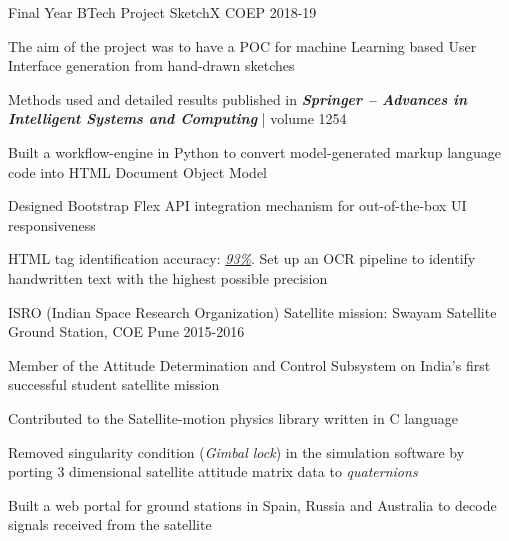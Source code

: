 
\begin{cventries}

    \cventry
    {Final Year BTech Project} %
    {SketchX} %
    {COEP} %
    {2018-19} %
    {
      \begin{cvitems} %
      	\item {The aim of the project was to have a POC for machine Learning based User Interface generation from hand-drawn sketches}
      	 \item {Methods used and detailed results published in \textbf{\textit{Springer – Advances in Intelligent Systems and Computing}} | volume 1254
        }
      	\item {Built a workflow-engine in Python to convert model-generated markup language code into HTML Document Object Model}
      	\item{Designed Bootstrap Flex API integration mechanism for out-of-the-box UI responsiveness}
      	\item {HTML tag identification accuracy: \underline{\textit{93\%}}. Set up an OCR pipeline to identify handwritten text with the highest possible precision}
      \end{cvitems}
    }
    
    
  \cventry
    {ISRO (Indian Space Research Organization)} %
    {Satellite mission: Swayam} %
    {Satellite Ground Station, COE Pune} %
    {2015-2016} %
    {
      \begin{cvitems} %
        \item {Member of the Attitude Determination and Control Subsystem on India's first successful student satellite mission}
        \item {Contributed to the Satellite-motion physics library written in C language}
		\item {Removed singularity condition (\textit{Gimbal lock}) in the simulation software by porting 3 dimensional satellite attitude matrix data to \textit{quaternions}}
		\item {Built a web portal for ground stations in Spain, Russia and Australia to decode signals received from the satellite}
      \end{cvitems}
    }
\end{cventries}